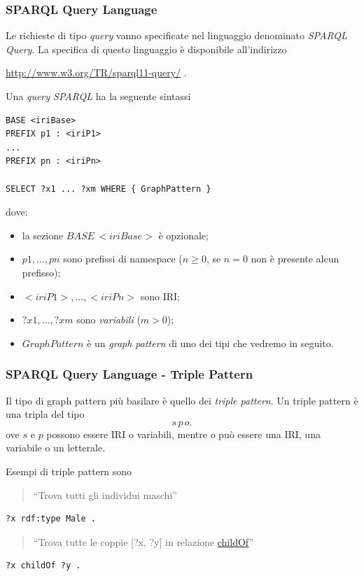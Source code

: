 \documentclass[8pt]{beamer}
\begin{document}
\begin{frame}[fragile]
\frametitle{SPARQL Query Language}
Le richieste di tipo \emph{query} vanno specificate nel linguaggio
denominato \emph{SPARQL Query}.
%
La specifica di questo linguaggio \`e disponibile all'indirizzo
\begin{center}
 \url{http://www.w3.org/TR/sparql11-query/} .
\end{center}

Una \emph{query SPARQL} ha la seguente sintassi
\begin{Verbatim}[fontsize=\small]
BASE <iriBase>
PREFIX p1 : <iriP1>
...
PREFIX pn : <iriPn>

SELECT ?x1 ... ?xm WHERE { GraphPattern }
\end{Verbatim}
dove: 
\begin{itemize}
 \item la sezione $BASE\,<iriBase>$ \`e opzionale;
 \item $p1, \ldots, pn$ sono prefissi di namespace ($n\geq0$, se $n=0$ non \`e presente alcun prefisso);
 \item $<iriP1>, \ldots, <iriPn>$ sono IRI;
 \item $?x1, \ldots, ?xm$ sono \emph{variabili} ($m>0$);
 \item $GraphPattern$ \`e un \emph{graph pattern} di uno dei tipi che vedremo in seguito.
\end{itemize}
\end{frame}

\begin{frame}[fragile]
\frametitle{SPARQL Query Language - Triple Pattern}
Il tipo di graph pattern più basilare \`e quello dei \emph{triple pattern}.
Un triple pattern \`e una tripla del tipo
\[
 s \, p \, o . 
\]
ove $s$ e $p$ possono essere IRI o variabili, mentre $o$ pu\`o essere una
IRI, una variabile o un letterale.
\vspace{\baselineskip}

Esempi di triple pattern sono

\begin{quote}
``Trova tutti gli individui maschi''
\end{quote}
\begin{Verbatim}[fontsize=\small]
?x rdf:type Male . 
\end{Verbatim}

\begin{quote}
``Trova tutte le coppie [?x, ?y] in relazione \url{childOf}''
\end{quote}
\begin{Verbatim}[fontsize=\small]
?x childOf ?y . 
\end{Verbatim}
\end{frame}
\end{document}
